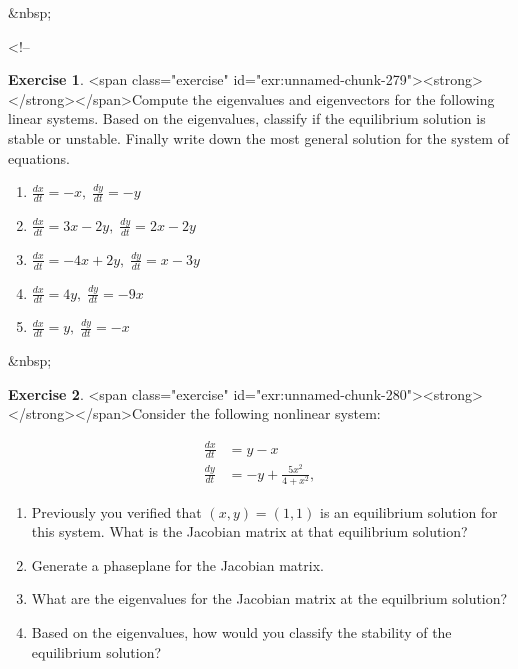 \documentclass[
]{book}
\theoremstyle{definition}
\theoremstyle{definition}
\theoremstyle{definition}
\newtheorem{exercise}{Exercise}[chapter]
\theoremstyle{remark}
\begin{document}
&nbsp;

<!-- %
\begin{exercise}
<span class="exercise" id="exr:unnamed-chunk-279"><strong>\label{exr:unnamed-chunk-279} </strong></span>Compute the eigenvalues and eigenvectors for the following linear systems.  Based on the eigenvalues, classify if the equilibrium solution is stable or unstable.  Finally write down the most general solution for the system of equations.

\begin{enumerate}[label=\alph*.]
\item $\displaystyle \frac{dx}{dt} = -x, \;  \frac{dy}{dt} = -y$
\item $\displaystyle \frac{dx}{dt} = 3x-2y, \;  \frac{dy}{dt} = 2x-2y$
\item $\displaystyle \frac{dx}{dt} = -4x+2y, \;  \frac{dy}{dt} = x-3y$
\item $\displaystyle \frac{dx}{dt}= 4y, \; \frac{dy}{dt}=-9x$
\item $\displaystyle \frac{dx}{dt} = y, \;  \frac{dy}{dt} = -x$
\end{enumerate}
\end{exercise}
&nbsp;
\begin{exercise}
<span class="exercise" id="exr:unnamed-chunk-280"><strong>\label{exr:unnamed-chunk-280} </strong></span>Consider the following nonlinear system:


\begin{equation}
\begin{split}
\frac{dx}{dt} &= y-x \\
\frac{dy}{dt} &=-y + \frac{5x^2}{4+x^{2}},
\end{split}
\end{equation}  

\begin{enumerate}[label=\alph*/]
\item Previously you verified that $(x,y)=(1,1)$ is an equilibrium solution for this system.  What is the Jacobian matrix at that equilibrium solution?
\item Generate a phaseplane for the Jacobian matrix.
\item What are the eigenvalues for the Jacobian matrix at the equilbrium solution?
\item Based on the eigenvalues, how would you classify the stability of the equilibrium solution?
\end{enumerate}
\end{exercise}
\end{document}
